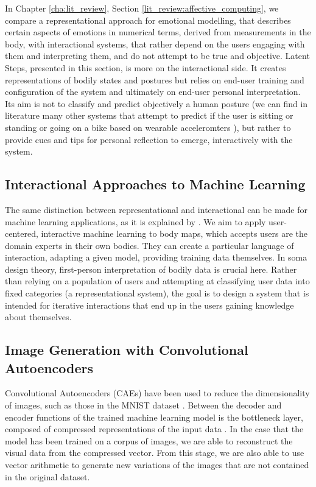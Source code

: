 In Chapter \ref{cha:lit_review}, Section \ref{lit_review:affective_computing}, we compare a representational approach for emotional modelling, that describes certain aspects of emotions in numerical terms, derived from measurements in the body, with interactional systems, that rather depend on the users engaging with them and interpreting them, and do not attempt to be true and objective. Latent Steps, presented in this section, is more on the interactional side. It creates representations of bodily states and postures but relies on end-user training and configuration of the system and ultimately on end-user personal interpretation. Its aim is not to classify and predict objectively a human posture (we can find in literature many other systems that attempt to predict if the user is sitting or standing or going on a bike based on wearable acceleromters \cite{slim_survey_2019}), but rather to provide cues and tips for personal reflection to emerge, interactively with the system.

\subsection*{Interactional Approaches to Machine Learning}

The same distinction between representational and interactional can be made for machine learning applications, as it is explained by \citeauthor{gillies_understanding_2019} \cite{gillies_understanding_2019,bishop_non-representational_2014}. We aim to apply user-centered, interactive machine learning to body maps, which accepts users are the domain experts in their own bodies. They can create a particular language of interaction, adapting a given model, providing training data themselves. In soma design theory, first-person interpretation of bodily data is crucial here. Rather than relying on a population of users and attempting at classifying user data into fixed categories (a representational system), the goal is to design a system that is intended for iterative interactions that end up in the users gaining knowledge about themselves.

\subsection*{Image Generation with Convolutional Autoencoders}

Convolutional Autoencoders (CAEs) have been used to reduce the dimensionality of images, such as those in the MNIST dataset \cite{wang_auto-encoder_2016}. Between the decoder and encoder functions of the trained machine learning model is the bottleneck layer, composed of compressed representations of the input data \cite{zhang_better_nodate}. In the case that the model has been trained on a corpus of images, we are able to reconstruct the visual data from the compressed vector. From this stage, we are also able to use vector arithmetic to generate new variations of the images that are not contained in the original dataset.

